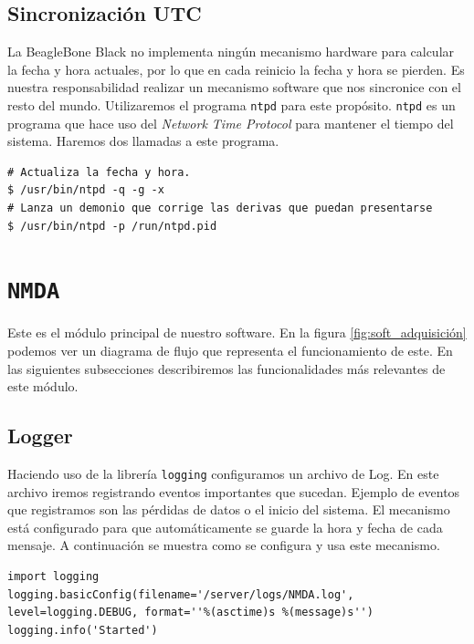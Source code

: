 	\subsection{Sincronización UTC}
		La BeagleBone Black no implementa ningún mecanismo hardware para calcular la fecha y hora actuales, por lo que en cada reinicio la
		fecha y hora se pierden. Es nuestra responsabilidad realizar un mecanismo software que nos sincronice con el resto del mundo\cite{ntpd}.
		Utilizaremos el programa \texttt{ntpd} para este propósito. \texttt{ntpd} es un programa que hace uso del 
		\emph{Network Time Protocol}\cite{ntpWiki} para mantener el tiempo del sistema. Haremos dos llamadas a este programa.
		\begin{lstlisting}[style=myBash]
# Actualiza la fecha y hora.
$ /usr/bin/ntpd -q -g -x
# Lanza un demonio que corrige las derivas que puedan presentarse
$ /usr/bin/ntpd -p /run/ntpd.pid
		\end{lstlisting}


\section{\texttt{NMDA}}
	Este es el módulo principal de nuestro software. En la figura \ref{fig:soft_adquisición} podemos ver un diagrama de flujo que representa el
	funcionamiento de este. En las siguientes subsecciones describiremos las funcionalidades más relevantes de este módulo.
	\subsection{Logger}
		Haciendo uso de la librería \texttt{logging}\cite{py_logging} configuramos un archivo de Log. En este archivo iremos registrando eventos importantes
		que sucedan. Ejemplo de eventos que registramos son las pérdidas de datos o el inicio del sistema. El mecanismo está configurado para
		que automáticamente se guarde la hora y fecha de cada mensaje. A continuación se muestra como se configura y usa este mecanismo.
		\begin{lstlisting}[style=myPython]
import logging
logging.basicConfig(filename='/server/logs/NMDA.log', level=logging.DEBUG, format=''%(asctime)s %(message)s'')
logging.info('Started')
		\end{lstlisting}
